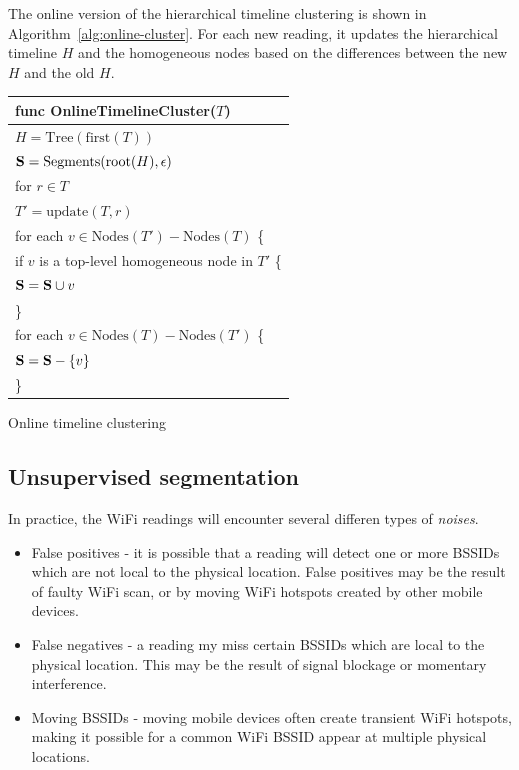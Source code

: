 The online version of the hierarchical timeline clustering is shown in
Algorithm~\ref{alg:online-cluster}.  For each new reading, it updates the
hierarchical timeline $H$ and the homogeneous nodes based on the differences
between the new $H$ and the old $H$.

\begin{algorithm}[t]
    \centering
    \begin{tabular}{|l|}\hline
        func OnlineTimelineCluster($T$) \\ \hline
        $H = \mathrm{Tree}(\mathrm{first}(T))$ \\
        $\mathbf{S} = \mathrm{Segments}(\mathrm{root}(H), \epsilon)$ \\
        for $r\in T$ \\
        \RRR $T' = \mathrm{update}(T, r)$ \\
        \RRR for each $v\in \mathrm{Nodes}(T') - \mathrm{Nodes}(T)$ \{\\
        \RRR \RRR if $v$ is a top-level homogeneous node in $T'$ \{\\
        \RRR \RRR \RRR $\mathbf{S} = \mathbf{S}\cup v$ \\
        \RRR \} \\
        \RRR for each $v\in \mathrm{Nodes}(T) - \mathrm{Nodes}(T')$ \{\\
        \RRR \RRR $\mathbf{S} = \mathbf{S} - \{v\}$ \\
        \RRR \} \\ \hline
    \end{tabular}
    \vspace{0.5cm}
    \caption{Online timeline clustering}
    \label{alg:online-cluster}
\end{algorithm}

\subsection{Unsupervised segmentation}

In practice, the WiFi readings will encounter several differen types of {\em
noises}.

\begin{itemize}
    \item False positives - it is possible that a reading will detect one or
        more BSSIDs which are not local to the physical location.  False
        positives may be the result of faulty WiFi scan, or by moving WiFi
        hotspots created by other mobile devices.
    \item False negatives - a reading my miss certain BSSIDs which are local to
        the physical location.  This may be the result of signal blockage or
        momentary interference.
    \item Moving BSSIDs - moving mobile devices often create transient WiFi
        hotspots, making it possible for a common WiFi BSSID appear at multiple
        physical locations.
\end{itemize}

